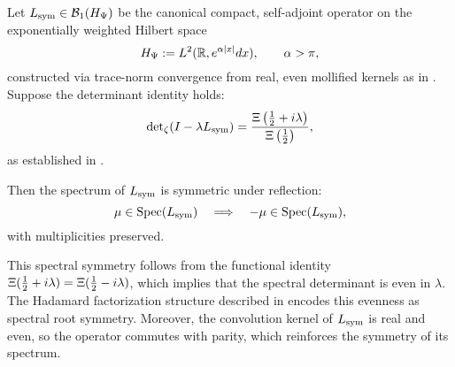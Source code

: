 \begin{lemma}
\label{lem:spectral_symmetry}

Let \( L_{\mathrm{sym}} \in \mathcal{B}_1(H_{\Psi}) \) be the canonical compact, self-adjoint operator on the exponentially weighted Hilbert space
\[
H_{\Psi} := L^2(\mathbb{R}, e^{\alpha |x|} dx), \qquad \alpha > \pi,
\]
constructed via trace-norm convergence from real, even mollified kernels as in . Suppose the determinant identity holds:
\[
\det\nolimits_\zeta(I - \lambda L_{\mathrm{sym}}) = \frac{\Xi\left( \tfrac{1}{2} + i\lambda \right)}{\Xi\left( \tfrac{1}{2} \right)},
\]
as established in .

Then the spectrum of \( L_{\mathrm{sym}} \) is symmetric under reflection:
\[
\mu \in \operatorname{Spec}(L_{\mathrm{sym}}) \quad \Longrightarrow \quad -\mu \in \operatorname{Spec}(L_{\mathrm{sym}}),
\]
with multiplicities preserved.

\medskip

\noindent
This spectral symmetry follows from the functional identity \( \Xi(\tfrac{1}{2} + i\lambda) = \Xi(\tfrac{1}{2} - i\lambda) \), which implies that the spectral determinant is even in \( \lambda \). The Hadamard factorization structure described in  encodes this evenness as spectral root symmetry. Moreover, the convolution kernel of \( L_{\mathrm{sym}} \) is real and even, so the operator commutes with parity, which reinforces the symmetry of its spectrum.
\end{lemma}

